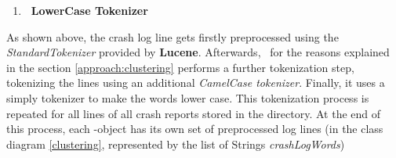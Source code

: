 \begin{enumerate}
\item \textbf{\toolname\ LowerCase Tokenizer} \\ \vspace{0.3em}
\end{enumerate}
As shown above, the crash log line gets firstly preprocessed using the \textit{StandardTokenizer} provided by \textbf{Lucene}.
Afterwards, \toolname\ for the reasons explained in the section \ref{approach:clustering} performs a further tokenization step, tokenizing the lines using an additional \textit{CamelCase tokenizer}. 
Finally, it uses a simply tokenizer to make the words lower case. 
This tokenization process is repeated for all lines of all crash reports stored in the directory. At the end of this process, each \Crash-object has its own set of preprocessed log lines (in the class diagram \ref{clustering}, represented by the list of Strings \textit{crashLogWords})

